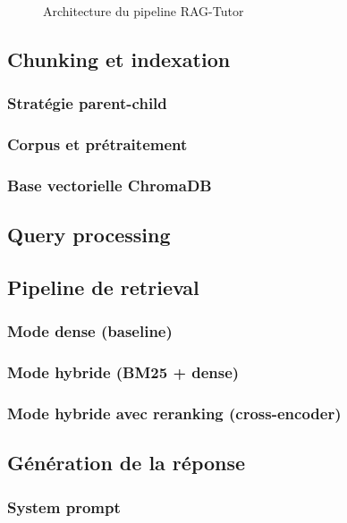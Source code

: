 \documentclass{rapportECL}
\begin{document}
\begin{figure}[H]
\centering
\caption{Architecture du pipeline RAG-Tutor}
\label{fig:architecture}
\end{figure}

\subsection{Chunking et indexation}

\subsubsection{Stratégie parent-child}
\subsubsection{Corpus et prétraitement}
\subsubsection{Base vectorielle ChromaDB}

\subsection{Query processing}

\subsection{Pipeline de retrieval}

\subsubsection{Mode dense (baseline)}
\subsubsection{Mode hybride (BM25 + dense)}
\subsubsection{Mode hybride avec reranking (cross-encoder)}

\subsection{Génération de la réponse}

\subsubsection{System prompt}
\end{document}
